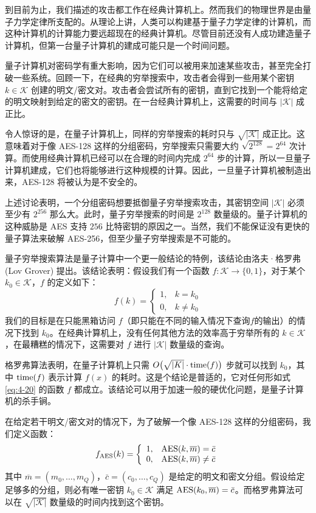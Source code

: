 到目前为止，我们描述的攻击都工作在经典计算机上。然而我们的物理世界是由量子力学定律所支配的。从理论上讲，人类可以构建基于量子力学定律的计算机，而这种计算机的计算能力要远超现在的经典计算机。尽管目前还没有人成功建造量子计算机，但第一台量子计算机的建成可能只是一个时间问题。

量子计算机对密码学有重大影响，因为它们可以被用来加速某些攻击，甚至完全打破一些系统。回顾一下，在经典的穷举搜索中，攻击者会得到一些用某个密钥 $k\in\mathcal{K}$ 创建的明文/密文对。攻击者会尝试所有的密钥，直到它找到一个能将给定的明文映射到给定的密文的密钥。在一台经典计算机上，这需要的时间与 $|\mathcal{K}|$ 成正比。


\begin{snote}[量子穷举搜索。]
令人惊讶的是，在量子计算机上，同样的穷举搜索的耗时只与 $\sqrt{|\mathcal{K}|}$ 成正比。这意味着对于像 AES-128 这样的分组密码，穷举搜索只需要大约 $\sqrt{2^{128}}=2^{64}$ 次计算。而使用经典计算机已经可以在合理的时间内完成 $2^{64}$ 步的计算，所以一旦量子计算机建成，它们也将能够进行这种规模的计算。因此，一旦量子计算机被制造出来，AES-128 将被认为是不安全的。

上述讨论表明，一个分组密码想要抵御量子穷举搜索攻击，其密钥空间 $|\mathcal{K}|$ 必须至少有 $2^{256}$ 那么大。此时，量子穷举搜索的时间是 $2^{128}$ 数量级的。量子计算机的这种威胁是 AES 支持 $256$ 比特密钥的原因之一。当然，我们不能保证没有更快的量子算法来破解 AES-256，但至少量子穷举搜索是不可能的。
\end{snote}

\begin{snote}[格罗弗算法。]
量子穷举搜索算法是量子计算中一个更一般结论的特例，该结论由洛夫·格罗弗 (Lov Grover) 提出。该结论表明：假设我们有一个函数 $f:\mathcal{K}\to\{0,1\}$，对于某个 $k_0\in\mathcal{K}$，$f$ 的定义如下：
\begin{equation}\label{eq:4-20}
f(k)=\left\{
\begin{array}{ll}
1, & k=k_0\\
0, & k\neq k_0
\end{array}
\right.
\end{equation}
我们的目标是在只能黑箱访问 $f$（即只能在不同的输入情况下查询$f$的输出）的情况下找到 $k_0$。在经典计算机上，没有任何其他方法的效率高于穷举所有的 $k\in\mathcal{K}$，在最糟糕的情况下，这需要对 $f$ 进行 $|\mathcal{K}|$ 数量级的查询。

格罗弗算法表明，在量子计算机上只需 $O\big(\sqrt{|K|}\cdot{\rm time}(f)\big)$ 步就可以找到 $k_0$，其中 ${\rm time}(f)$ 表示计算 $f(x)$ 的耗时。这是个结论是普适的，它对任何形如式 \ref{eq:4-20} 的函数 $f$ 都成立。该结论可以用于加速一般的硬优化问题，是量子计算机的杀手锏。

在给定若干明文/密文对的情况下，为了破解一个像 AES-128 这样的分组密码，我们定义函数：
\[
f_{\rm AES}(k)=\left\{
\begin{array}{ll}
1, & {\rm AES}(k,\overline m)=\bar c\\
0, & {\rm AES}(k,\overline m)\neq\bar c
\end{array}
\right.
\]
其中 $\overline m=(m_0,\dots,m_Q)$，$\bar c=(c_0,\dots,c_Q)$ 是给定的明文和密文分组。假设给定足够多的分组，则必有唯一密钥 $k_0\in\mathcal{K}$ 满足 ${\rm AES}(k_0,\overline m)=\bar c$。而格罗弗算法可以在 $\sqrt{|\mathcal{K}|}$ 数量级的时间内找到这个密钥。
\end{snote}